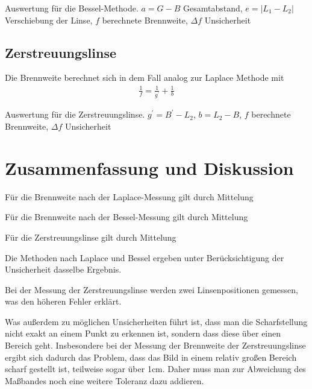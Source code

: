 \documentclass{article}
\begin{document}
\begin{table}[H]
\caption{Auswertung für die Bessel-Methode. $a = G-B$ Gesamtabstand, $e = |L_1-L_2|$ Verschiebung der Linse, $f$ berechnete Brennweite, $\Delta f$ Unsicherheit}
\label{tab:bessel_auswertung}
\centering

\end{table}


\subsection{Zerstreuungslinse}

Die Brennweite berechnet sich in dem Fall analog zur Laplace Methode mit
\begin{align}
\frac1f = \frac{1}{g^\prime} + \frac1b
\end{align}


\begin{table}[H]
\caption{Auswertung für die Zerstreuungslinse. $g^\prime = B^\prime - L_2$, $b = L_2 -B$, $f$ berechnete Brennweite, $\Delta f$ Unsicherheit}
\label{tab:zerstreuungslinse_auswertung}
\centering

\end{table}




\section{Zusammenfassung und Diskussion}

Für die Brennweite nach der Laplace-Messung gilt durch Mittelung 


Für die Brennweite nach der Bessel-Messung gilt durch Mittelung 


Für die Zerstreuungslinse gilt durch Mittelung 



Die Methoden nach Laplace und Bessel ergeben unter Berücksichtigung der Unsicherheit dasselbe Ergebnis.

Bei der Messung der Zerstreuungslinse werden zwei Linsenpositionen gemessen, was den höheren Fehler erklärt. 

Was außerdem zu möglichen Unsicherheiten führt ist, dass man die Scharfstellung nicht exakt an einem Punkt zu erkennen ist, sondern dass diese über einen Bereich geht. Insbesondere bei der Messung der Brennweite der Zerstreuungslinse ergibt sich dadurch das Problem, dass das Bild in einem relativ großen Bereich scharf gestellt ist, teilweise sogar über 1cm. Daher muss man zur Abweichung des Maßbandes noch eine weitere Toleranz dazu addieren.
\end{document}
